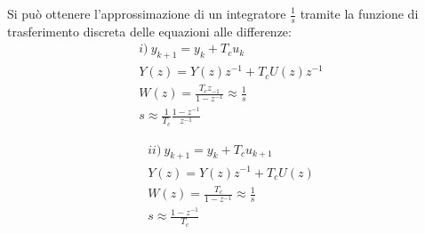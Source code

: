 \documentclass{article}
\numberwithin{equation}{subsection}
\begin{document}
Si può ottenere l'approssimazione di un integratore $\displaystyle\frac{1}{s}$ tramite la funzione di trasferimento discreta delle equazioni alle differenze:
\begin{gather}
    i)\:y_{k+1}=y_k+T_cu_k\\
    Y(z)=Y(z)z^{-1}+T_cU(z)z^{-1}\\
    W(z)=\displaystyle\frac{T_cz_{-1}}{1-z^{-1}}\approx\frac{1}{s}\\
    s\approx\displaystyle\frac{1}{T_c}\frac{1-z^{-1}}{z^{-1}}
\end{gather}


\begin{gather}
    ii)\:y_{k+1}=y_k+T_cu_{k+1}\\
    Y(z)=Y(z)z^{-1}+T_cU(z)\\
    W(z)=\displaystyle\frac{T_c}{1-z^{-1}}\approx\frac{1}{s}\\
    s\approx\displaystyle\frac{1-z^{-1}}{T_c}
\end{gather}
\end{document}
